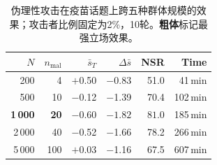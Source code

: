 \begin{table}[!t]
\centering
\caption{伪理性攻击在疫苗话题上跨五种群体规模的效果；攻击者比例固定为2\%，10轮。\textbf{粗体}标记最强立场效果。}
\label{tab:scale}

\vspace{2pt}
\renewcommand{\arraystretch}{1.12}
\setlength{\tabcolsep}{2.8pt}
\scriptsize

\begin{tabular}{@{}r r r r r r@{}}

\toprule

{$N$} & {$n_\text{mal}$}
& {$\bar{s}_T$} & {$\Delta\bar{s}$} & {NSR}
& {Time}
\\

\midrule

200  & 4
  & $+$0.50 & $-$0.83 & 51.0
  & 41\,min
\\

\rowcolor{rowalt}
500  & 10
  & $-$0.12 & $-$1.39 & 70.4
  & 102\,min
\\

\rowcolor{peak}
\textbf{1\,000} & \textbf{20}
  & $\mathbf{-0.60}$ & $\mathbf{-1.82}$ & $\mathbf{81.0}$
  & 185\,min
\\

\rowcolor{rowalt}
2\,000  & 40
  & $-$0.52 & $-$1.66 & 78.2
  & 266\,min
\\

5\,000  & 100
  & $+$0.03 & $-$1.16 & 67.5
  & 607\,min
\\

\bottomrule

\end{tabular}
\end{table}
